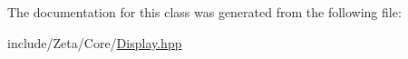 The documentation for this class was generated from the following file\+:\begin{DoxyCompactItemize}
\item 
include/\+Zeta/\+Core/\hyperlink{Display_8hpp}{Display.\+hpp}\end{DoxyCompactItemize}
